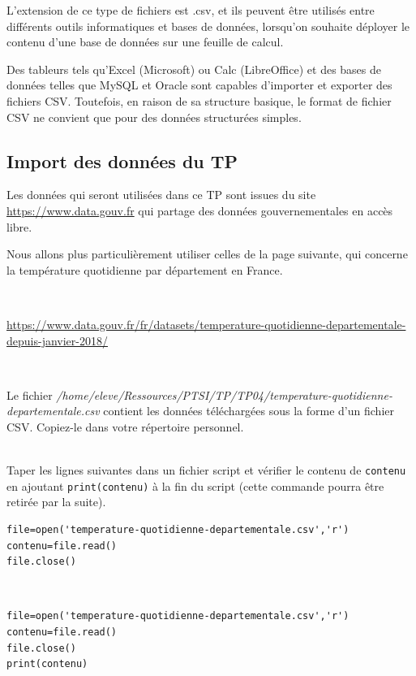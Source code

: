 L'extension de ce type de fichiers est .csv, et ils peuvent être utilisés entre différents outils informatiques et bases de données, lorsqu'on souhaite déployer le contenu d'une base de données sur une feuille de calcul.

Des tableurs tels qu'Excel (Microsoft) ou Calc (LibreOffice) et des bases de données telles que MySQL et Oracle sont capables d'importer et exporter des fichiers CSV. Toutefois, en raison de sa structure basique, le format de fichier CSV ne convient que pour des données structurées simples.

\subsection{Import des données du TP}

Les données qui seront utilisées dans ce TP sont issues du site \url{https://www.data.gouv.fr} qui partage des données gouvernementales en accès libre.

Nous allons plus particulièrement utiliser celles de la page suivante, qui concerne la température quotidienne par département en France.

~\

\url{https://www.data.gouv.fr/fr/datasets/temperature-quotidienne-departementale-depuis-janvier-2018/}

~\

Le fichier \textit{/home/eleve/Ressources/PTSI/TP/TP04/temperature-quotidienne-departementale.csv} contient les données téléchargées sous la forme d'un fichier CSV. Copiez-le dans votre répertoire personnel.

\begin{exercice}~\\
Taper les lignes suivantes dans un fichier script et vérifier le contenu de \verb?contenu? en ajoutant \verb?print(contenu)? à la fin du script (cette commande pourra être retirée par la suite).
\end{exercice}

\begin{verbatim}
file=open('temperature-quotidienne-departementale.csv','r')
contenu=file.read()
file.close()
\end{verbatim}

\begin{solution}~\ \\
\begin{verbatim}
file=open('temperature-quotidienne-departementale.csv','r')
contenu=file.read()
file.close()
print(contenu)
\end{verbatim}
\end{solution}

